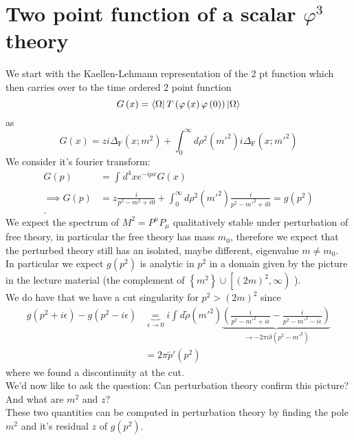\documentclass{report}
\begin{document}
\section{Two point function of a scalar $\varphi^3$ theory}
We start with the Kaellen-Lehmann representation of the 2 pt function which then carries over to the time ordered 2 point function \[
G\left( x \right) = \bra{\Omega} T\left( \varphi\left( x \right) \varphi\left( 0 \right)  \right) \ket{\Omega} 
\] as \[
G\left( x \right) = z i \Delta_\text{F} \left( x; m^2 \right) + \int_{0}^{\infty} d\rho^2\left( m'^2 \right) i \Delta_\text{F} \left( x; m'^2 \right)  
\] We consider it's fourier transform: 
\begin{align*}
  G\left( p \right) &= \int_{}^{} d^{4}x e^{-ipx} G\left( x \right)   \\
  \implies G\left( p \right) &= z \frac{i}{p^2 - m^2 + i 0} + \int_{0}^{\infty} d\rho^2\left( m'^2 \right) \frac{i}{p^2 - m'^2 + i 0} = g\left( p^2 \right)   \\
.\end{align*}
We expect the spectrum of $M^2 = P^{\mu} P_\mu$ qualitatively stable under perturbation of free theory, in particular the free theory has mass $m_0$, therefore we expect that the perturbed theory still has an isolated, maybe different, eigenvalue $m \neq m_0$.\\
In particular we expect $g\left( p^2 \right) $ is analytic in $p^2$ in a domain given by the picture in the lecture material (the complement of $\left\{ m^2 \right\} \cup \left[ \left( 2m \right) ^2, \infty \right)$ ). \\
We do have that we have a cut singularity for $p^2 > \left( 2m \right) ^2$ since
\begin{align*}
  g\left( p^2 + i \epsilon \right) - g\left( p^2 - i \epsilon \right) &\underbrace{=}_{\epsilon \to  0} i \int_{}^{} d\tilde{\rho}\left( m'^2 \right) \underbrace{ \left( \frac{i}{p^2 - m'^2 + i\epsilon} - \frac{i}{p^2 - m'^2 -  i\epsilon}  \right)}_{\to -2\pi i \delta\left( p^2 - m'^2 \right) } \\
  &= 2\pi \tilde{p}'\left( p^2 \right) 
\end{align*}
where we found a discontinuity at the cut. \\
We'd now like to ask the question: Can perturbation theory confirm this picture? And what are $m^2$ and $z$?\\
These two quantities can be computed in perturbation theory by finding the pole $m^2$ and it's residual $z$ of $g\left( p^2 \right) $.\\
\end{document}
